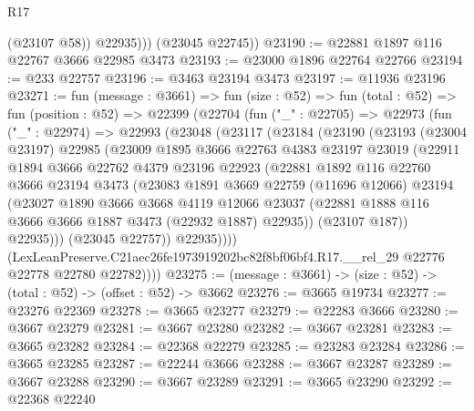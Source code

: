 \begin{lexlean}{R17}
\begin{coremodule}
              (@23107 @58))
            @22935)))
      (@23045 @22745))
@23190 := @22881 @1897 @116 @22767 @3666 @22985 @3473
@23193 := @23000 @1896 @22764 @22766
@23194 := @233 @22757
@23196 := @3463 @23194 @3473
@23197 := @11936 @23196
@23271 := fun (message : @3661) =>
  fun (size : @52) =>
  fun (total : @52) =>
  fun (position : @52) =>
  @22399
    (@22704
      (fun ("_" : @22705) =>
      @22973
        (fun ("_" : @22974) =>
        @22993
          (@23048
            (@23117
              (@23184
                (@23190
                  (@23193
                    (@23004 @23197)
                    @22985
                    (@23009
                      @1895
                      @3666
                      @22763
                      @4383
                      @23197
                      @23019
                      (@22911
                        @1894
                        @3666
                        @22762
                        @4379
                        @23196
                        @22923
                        (@22881
                          @1892
                          @116
                          @22760
                          @3666
                          @23194
                          @3473
                          (@23083
                            @1891
                            @3669
                            @22759
                            (@11696 @12066)
                            @23194
                            (@23027
                              @1890
                              @3666
                              @3668
                              @4119
                              @12066
                              @23037
                              (@22881 @1888 @116 @3666 @3666 @1887 @3473 (@22932 @1887) @22935))
                            (@23107 @187))
                          @22935)))
                    (@23045 @22757))
                  @22935))))
          (LexLeanPreserve.C21aec26fe1973919202bc82f8bf06bf4.R17.__rel_29
            @22776
            @22778
            @22780
            @22782))))
@23275 := (message : @3661) -> (size : @52) -> (total : @52) -> (offset : @52) -> @3662
@23276 := @3665 @19734
@23277 := @23276 @22369
@23278 := @3665 @23277
@23279 := @22283 @3666
@23280 := @3667 @23279
@23281 := @3667 @23280
@23282 := @3667 @23281
@23283 := @3665 @23282
@23284 := @22368 @22279
@23285 := @23283 @23284
@23286 := @3665 @23285
@23287 := @22244 @3666
@23288 := @3667 @23287
@23289 := @3667 @23288
@23290 := @3667 @23289
@23291 := @3665 @23290
@23292 := @22368 @22240

\end{coremodule}
\end{lexlean}
